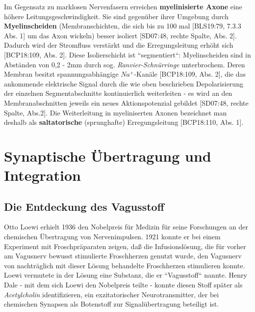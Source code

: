 {{Im Gegensatz zu marklosen Nervenfasern erreichen \textbf{myelinisierte Axone}  eine höhere Leitungsgeschwindigkeit.
Sie sind gegenüber ihrer Umgebung durch \textbf{Myelinscheiden}  (Membranschichten, die sich bis zu 100 mal [BLS19:79, 7.3.3 Abs. 1] um das Axon wickeln) besser isoliert [SD07:48, rechte Spalte, Abs. 2].
Dadurch wird der Stromfluss verstärkt und die Erregungsleitung erhöht sich [BCP18:109, Abs. 2]. 
Diese Isolierschicht ist ``segmentiert``: Myelinscheiden sind in Abständen von 0,2 - 2mm durch sog.  \textit{Ranvier-Schnürringe} unterbrochem.
Deren Membran besitzt spannungsabhängige $Na^+$-Kanäle [BCP18:109, Abs. 2], die das ankommende elektrische Signal durch die wie oben beschrieben Depolarisierung der einzelnen Segmentabschnitte kontinuierlich weiterleiten - es wird an den Membranabschnitten jeweils ein neues Aktionspotenzial gebildet [SD07:48, rechte Spalte, Abs.2].
Die Weiterleitung in myeliniserten Axonen bezeichnet man deshalb als \textbf{saltatorische} (sprunghafte) Erregungsleitung [BCP18:110, Abs. 1].

\vskip 1.6in


\pagebreak

\section{Synaptische Übertragung und Integration}

\subsection{Die Entdeckung des Vagusstoff}

Otto Loewi erhielt 1936 den Nobelpreis für Medizin für seine Forschungen an der chemischen Übertragung von Nervenimpulsen. 
1921 konnte er bei einem Experiment mit Froschpräparaten zeigen, daß die Infusionslösung, die für vorher am Vagusnerv bewusst stimulierte Froschherzen genutzt wurde, den Vagusnerv von nachträglich mit dieser Lösung behandelte Froschherzen stimulieren konnte. 
Loewi vermutete in der Lösung eine Substanz, die er ``Vagusstoff`` nannte.
Henry Dale - mit dem sich Loewi den Nobelpreis teilte - konnte diesen Stoff später als \textit{Acetylcholin} identifizieren, ein exzitatorischer Neurotransmitter\footnotemark[52], der bei chemischen Synapsen als Botenstoff zur Signalübertragung beteiligt ist\footnotemark[53].

}}
